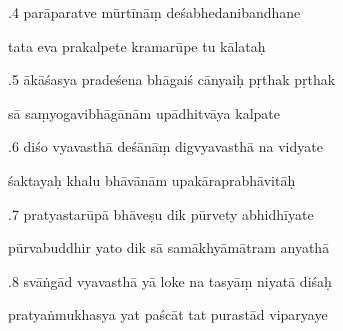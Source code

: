 \documentclass[article,12pt,a4paper]{memoir}%
\newcounter{parCount}
\begin{document}
	  
	  \pstart {}.4 parāparatve mūrtīnāṃ deśabhedanibandhane 
	{}
	\pend%
      

	  
	  \pstart \leavevmode%
	tata eva prakalpete kramarūpe tu kālataḥ 
	{}
	\pend%
      

	  
	  \pstart {}.5 ākāśasya pradeśena bhāgaiś cānyaiḥ pṛthak pṛthak 
	{}
	\pend%
      

	  
	  \pstart \leavevmode%
	sā saṃyogavibhāgānām upādhitvāya kalpate 
	{}
	\pend%
      

	  
	  \pstart {}.6 diśo vyavasthā deśānāṃ digvyavasthā na vidyate 
	{}
	\pend%
      

	  
	  \pstart \leavevmode%
	śaktayaḥ khalu bhāvānām upakāraprabhāvitāḥ 
	{}
	\pend%
      

	  
	  \pstart {}.7 pratyastarūpā bhāveṣu dik pūrvety abhidhīyate 
	{}
	\pend%
      

	  
	  \pstart \leavevmode%
	pūrvabuddhir yato dik sā samākhyāmātram anyathā 
	{}
	\pend%
      

	  
	  \pstart {}.8 svāṅgād vyavasthā yā loke na tasyāṃ niyatā diśaḥ 
	{}
	\pend%
      

	  
	  \pstart \leavevmode%
	pratyaṅmukhasya yat paścāt tat purastād viparyaye 
	{}
	\pend%
      
\end{document}
